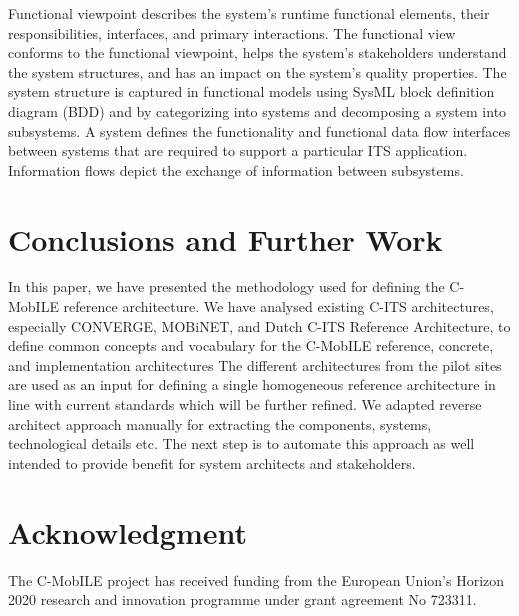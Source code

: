 \documentclass[conference]{IEEEtran}
\begin{document}
Functional viewpoint describes the system’s runtime functional elements, their responsibilities, interfaces, and primary interactions.
The functional view conforms to the functional viewpoint, helps the system’s stakeholders understand the system structures, and has an impact on the system’s quality properties.
The system structure is captured in functional models using SysML block definition diagram (BDD) and by categorizing into systems and decomposing a system into subsystems.
A system defines the functionality and functional data flow interfaces between systems that are required to support a particular ITS application.
Information flows depict the exchange of information between subsystems.


\section{Conclusions and Further Work}

In this paper, we have presented the methodology used for defining the C-MobILE reference architecture.
We have analysed existing C-ITS architectures, especially CONVERGE, MOBiNET, and Dutch C-ITS Reference Architecture, to define common concepts and vocabulary for the C-MobILE reference, concrete, and implementation architectures The different architectures from the pilot sites are used as an input for defining a single homogeneous reference architecture in line with current standards which will be further refined.
We adapted reverse architect approach manually for extracting the components, systems, technological details etc.
The next step is to automate this approach as well intended to provide benefit for system architects and stakeholders.


\section*{Acknowledgment}

The C-MobILE project has received funding from the European Union’s Horizon 2020 research and innovation programme under grant agreement No 723311.
\end{document}
